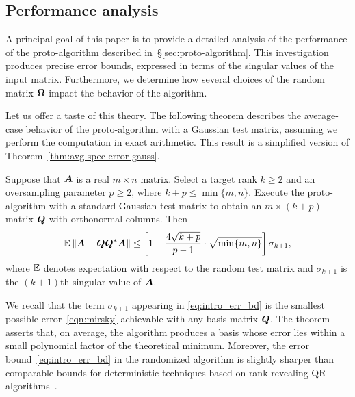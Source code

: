 \documentclass[final]{siamltex}
\newcounter{algorithm}[section]
\begin{document}
\subsection{Performance analysis}
\label{sec:prototheorem} A principal goal of this paper is to
provide a detailed analysis of the performance of the
proto-algorithm described in~\S\ref{sec:proto-algorithm}. This
investigation produces precise error bounds, expressed in terms of
the singular values of the input matrix. Furthermore, we determine
how several choices of the random matrix $\bm{\Omega}$ impact the
behavior of the algorithm.

Let us offer a taste of this theory.  The following theorem
describes the average-case behavior of the proto-algorithm
with a Gaussian test matrix, assuming we perform the computation
in exact arithmetic.  This result is a simplified version of
Theorem~\ref{thm:avg-spec-error-gauss}.

\lsp

\begin{theorem} %
Suppose that $\bm{A}$ is a real $m \times n$ matrix.  Select
a target rank $k \geq 2$ and an oversampling parameter $p \geq 2$,
where $k + p \leq \min\{m,n\}$.
Execute the proto-algorithm with
a standard Gaussian test matrix to obtain an
$m \times (k + p)$ matrix $\bm{Q}$ with orthonormal columns.  Then
\begin{equation}
\label{eq:intro_err_bd}
\Expect \norm{ \mtx{A} - \mtx{QQ}^\adj \mtx{A} }
    \leq \left[ 1 + \frac{4 \sqrt{k+p}}{p-1} \cdot\sqrt{\min\{m,n\}} \right] \sigma_{k+1},
\end{equation}
where $\operatorname{\mathbb{E}}$ denotes expectation with respect to the
random test matrix and $\sigma_{k+1}$ is the $(k+1)$th
singular value of $\bm{A}$.
\end{theorem}

\lsp

We recall that the term $\sigma_{k+1}$ appearing in \eqref{eq:intro_err_bd}
is the smallest possible error~\eqref{eqn:mirsky} achievable with any basis
matrix $\bm{Q}$. The theorem asserts that, on average,
the algorithm produces a basis whose error lies within a small
polynomial factor of the theoretical minimum.
Moreover, the error bound~\eqref{eq:intro_err_bd} in the randomized
algorithm is slightly sharper than comparable bounds for
deterministic techniques based on rank-revealing QR algorithms~\cite{gu_rrqr}.
\end{document}
